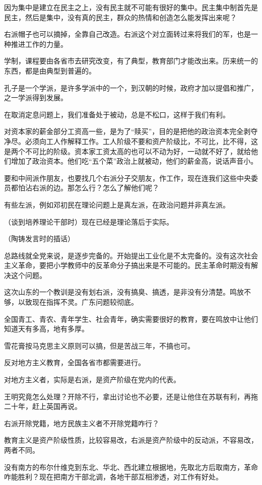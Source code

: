 因为集中是建立在民主之上，没有民主就不可能有很好的集中。民主集中制首先是民主，然后是集中，没有真的民主，群众的热情和创造怎么能发挥出来呢？

右派帽子也可以摘掉，全靠自己改造。右派这个对立面转过来将我们的军，也是一种推进工作的力量。

学制，课程要由各省市去研究改变，有了典型，教育部门才能改出来。历来统一的东西，都是由典型到普遍的。

孔子是一个学派，是许多学派中的一个，到汉朝的时候，政府才加以提倡和推广，之一学派得到发展。

在取消定息问题上，我们准备处于被动，总是不松口，这样于我们有利。

对资本家的薪金部分工资高一些，是为了“赎买”，目的是把他的政治资本完全剥夺净尽。必须向工人作解释工作。工人阶级不要和资产阶级比，不可比，比不得，这是两个不可比的阶级。资本家工资太高的也可以不动为好，一动就不好了，就给他们增加了政治资本。他们吃“五个菜”政治上就被动，他们的薪金高，说话声音小。

要和中间派作朋友，也要找几个右派分子交朋友，作工作，现在连我们这些中央委员都怕沾右派的边。那怎么行？怎么了解他们呢？

有些左派，例如邓初民在理论问题上是真左派，在政治问题并非真左派。

（谈到培养理论干部时）现在已经是理论落后于实际。

（陶铸发言时的插话）

总路线就全党来说，是逐步完备的。开始提出工业化是不太完备的。没有这次社会主义革命，要把小学教师中的反革命分子搞出来是不可能的。民主革命时期没有解决这个问题。

这次山东的一个教训是没有划右派，没有搞臭、搞透，是非没有分清楚。鸣放不够，以致现在指挥不灵。广东问题较彻底。

全国青工、青农、青年学生、社会青年，确实需要很好的教育，要在鸣放中让他们知道天有多高，地有多厚。

雪花膏按马克思主义原则可以搞，但是苦战三年，不搞也可。

反对地方主义教育，全国各省市都需要进行。

对地方主义者，实际是右派，是资产阶级在党内的代表。

王明究竟怎么处理？开除不行，拿出讨论也不必要，还是让他住在苏联有利，再拖二十年，赶上英国再说。

右派开除党籍，地方民族主义者不开除党籍咋行？

教育主义是资产阶级性质，比较容易改，右派是资产阶级中的反动派，不容易改，两者不同。

没有南方的布尔什维克到东北、华北、西北建立根据地，先取北方后取南方，革命咋能胜利？现在把南方干部北调，各地干部互相渗透，对工作有好处。

